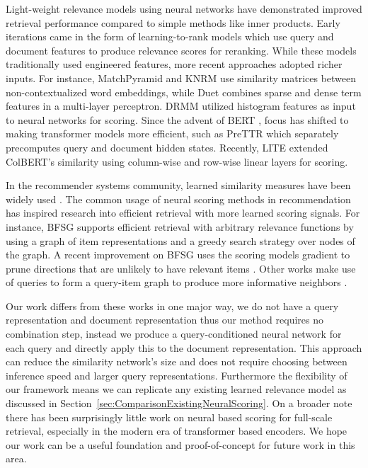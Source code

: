 Light-weight relevance models using neural networks have demonstrated improved retrieval performance compared to simple methods like inner products. Early iterations came in the form of learning-to-rank models \cite{RankNet, LearningToRankNonSmooth} which use query and document features to produce relevance scores for reranking. While these models traditionally used engineered features, more recent approaches adopted richer inputs. For instance, MatchPyramid \cite{MatchPyramid} and KNRM \cite{KNRM} use similarity matrices between non-contextualized word embeddings, while Duet \cite{Duetv1, DuetV2} combines sparse and dense term features in a multi-layer perceptron. DRMM \cite{DRMM} utilized histogram features as input to neural networks for scoring. Since the advent of BERT \cite{BERT}, focus has shifted to making transformer models more efficient, such as PreTTR \cite{PreTTR} which separately precomputes query and document hidden states. Recently, LITE \cite{LITE} extended ColBERT's similarity using column-wise and row-wise linear layers for scoring.

In the recommender systems community, learned similarity measures have been widely used \cite{LearnedCollaborativeFiltering, NeuralFactorizationMachines}. The common usage of neural scoring methods in recommendation has inspired research into efficient retrieval with more learned scoring signals. For instance, BFSG \cite{NeuralNetworkFastItemRanking} supports efficient retrieval with arbitrary relevance functions by using a graph of item representations and a greedy search strategy over nodes of the graph. A recent improvement on BFSG uses the scoring models gradient to prune directions that are unlikely to have relevant items \cite{GradientPruningTowardFastNeuralRanking}. Other works make use of queries to form a query-item graph to produce more informative neighbors \cite{FastNeuralRankingOnBipartiteGraphIndices}.

Our work differs from these works in one major way, we do not have a query representation and document representation thus our method requires no combination step, instead we produce a query-conditioned neural network for each query and directly apply this to the document representation. This approach can reduce the similarity network's size and does not require choosing between inference speed and larger query representations. Furthermore the flexibility of our framework means we can replicate any existing learned relevance model as discussed in Section~\ref{sec:ComparisonExistingNeuralScoring}. On a broader note there has been surprisingly little work on neural based scoring for full-scale retrieval, especially in the modern era of transformer based encoders. We hope our work can be a useful foundation and proof-of-concept for future work in this area.

